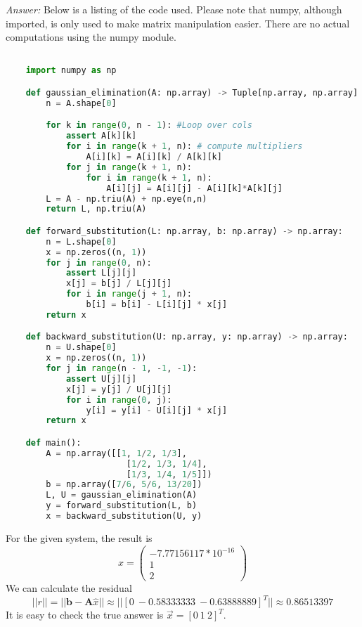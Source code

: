 \documentclass{article}
\begin{document}
    \textit{Answer:} Below is a listing of the code used. Please note that
    numpy, although imported, is only used to make matrix manipulation easier.
    There are no actual computations using the numpy module.
    \begin{lstlisting}[language=Python]

    import numpy as np

    def gaussian_elimination(A: np.array) -> Tuple[np.array, np.array]:
        n = A.shape[0]

        for k in range(0, n - 1): #Loop over cols
            assert A[k][k]
            for i in range(k + 1, n): # compute multipliers
                A[i][k] = A[i][k] / A[k][k]
            for j in range(k + 1, n):
                for i in range(k + 1, n):
                    A[i][j] = A[i][j] - A[i][k]*A[k][j]
        L = A - np.triu(A) + np.eye(n,n)
        return L, np.triu(A)

    def forward_substitution(L: np.array, b: np.array) -> np.array:
        n = L.shape[0]
        x = np.zeros((n, 1))
        for j in range(0, n):
            assert L[j][j]
            x[j] = b[j] / L[j][j]
            for i in range(j + 1, n):
                b[i] = b[i] - L[i][j] * x[j]
        return x

    def backward_substitution(U: np.array, y: np.array) -> np.array:
        n = U.shape[0]
        x = np.zeros((n, 1))
        for j in range(n - 1, -1, -1):
            assert U[j][j]
            x[j] = y[j] / U[j][j]
            for i in range(0, j):
                y[i] = y[i] - U[i][j] * x[j]
        return x

    def main():
        A = np.array([[1, 1/2, 1/3],
                        [1/2, 1/3, 1/4],
                        [1/3, 1/4, 1/5]])
        b = np.array([7/6, 5/6, 13/20])
        L, U = gaussian_elimination(A)
        y = forward_substitution(L, b)
        x = backward_substitution(U, y)
    \end{lstlisting}

    For the given system, the result is
    $$\hat{x} =
    \begin{pmatrix}
        -7.77156117*10^{-16} \\ 1 \\ 2
    \end{pmatrix}$$
    We can calculate the residual
    $$||r|| = ||\bm{b} - \bm{A}\hat{x}|| \approx ||[0\ -0.58333333\ -0.63888889]^T||
    \approx 0.86513397$$
    It is easy to check the true answer is $\vec{x} = [0\ 1\ 2]^T$.
\end{document}
